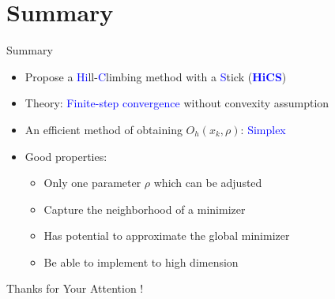 \documentclass{beamer}
\begin{document}
\section{Summary}
\begin{frame}{Summary}
	\begin{itemize}
		\item Propose a
\textcolor{blue}{Hi}ll-\textcolor{blue}{C}limbing
	method with a \textcolor{blue}{S}tick (\textcolor{blue}{\textbf{HiCS}})
		\item Theory: \textcolor{blue}{Finite-step
			convergence} \textcolor{mypink3}{without convexity assumption}
		\item An efficient method of obtaining $O_h(x_k, \rho)$: \textcolor{blue}{Simplex	}
		\item Good properties:
			\begin{itemize}
				\item Only one parameter $\rho$ which can be adjusted
				\item Capture the neighborhood of a minimizer
				\item Has potential to approximate the global minimizer
				\item Be able to implement to high dimension
			\end{itemize}
	\end{itemize}
\end{frame}

\begin{frame}
	\begin{centering}
	  \Huge Thanks for Your Attention ! \par
	\end{centering}
\end{frame}

%
\end{document}
